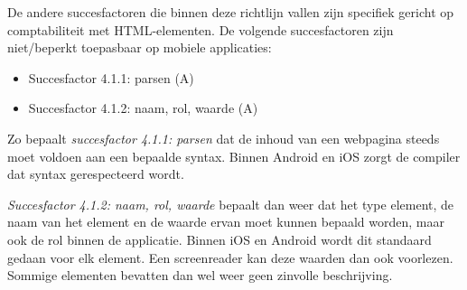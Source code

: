 De andere succesfactoren die binnen deze richtlijn vallen zijn specifiek gericht op comptabiliteit met HTML-elementen.
De volgende succesfactoren zijn niet/beperkt toepasbaar op mobiele applicaties:
\begin{itemize}
    \item Succesfactor 4.1.1: parsen (A)
    \item Succesfactor 4.1.2: naam, rol, waarde (A)
\end{itemize}

Zo bepaalt \textit{succesfactor 4.1.1: parsen} dat de inhoud van een webpagina steeds moet voldoen aan een bepaalde syntax. Binnen Android en iOS zorgt de compiler dat syntax gerespecteerd wordt. 

\textit{Succesfactor 4.1.2: naam, rol, waarde} bepaalt dan weer dat het type element, de naam van het element en de waarde ervan moet kunnen bepaald worden, maar ook de rol binnen de applicatie. Binnen iOS en Android wordt dit standaard gedaan voor elk element. Een screenreader kan deze waarden dan ook voorlezen. Sommige elementen bevatten dan wel weer geen zinvolle beschrijving.

